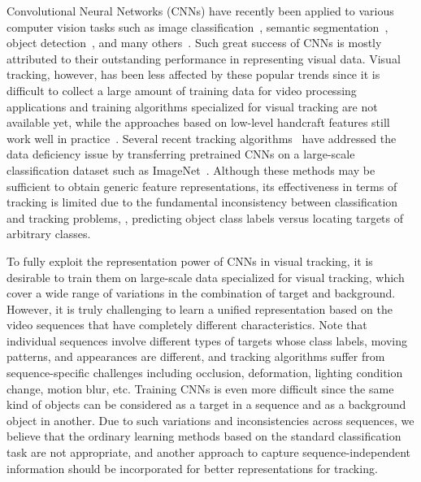 \documentclass[10pt,twocolumn,letterpaper]{article}
\begin{document}
Convolutional Neural Networks (CNNs) have recently been applied to various computer vision tasks such as image classification~\cite{krizhevsky2012imagenet,chatfield2014return,SimonyanICLR15}, semantic segmentation~\cite{long2014fully}, object detection~\cite{girshick2014rich}, and many others~\cite{toshev2014deeppose,taigman2014deepface}.
Such great success of CNNs is mostly attributed to their outstanding performance in representing visual data.
Visual tracking, however, has been less affected by these popular trends since it is difficult to collect a large amount of training data for video processing applications and training algorithms specialized for visual tracking are not available yet, while the approaches based on low-level handcraft features still work well in practice~\cite{henriques2015high,danelljan2014accurate,hong2015multi,zhang2014meem}. 
Several recent tracking algorithms~\cite{hong2015online,wang2015transferring} have addressed the data deficiency issue by transferring pretrained CNNs on a large-scale classification dataset such as ImageNet~\cite{ILSVRC15}. 
Although these methods may be sufficient to obtain generic feature representations, its effectiveness in terms of tracking is limited due to the fundamental inconsistency between classification and tracking problems, \ie, predicting object class labels versus locating targets of arbitrary classes.

To fully exploit the representation power of CNNs in visual tracking, it is desirable to train them on large-scale data specialized for visual tracking, which cover a wide range of variations in the combination of target and background.
However, it is truly challenging to learn a unified representation based on the video sequences that have completely different characteristics.
Note that individual sequences involve different types of targets whose class labels, moving patterns, and appearances are different, and tracking algorithms suffer from sequence-specific challenges including occlusion, deformation, lighting condition change, motion blur, etc.
Training CNNs is even more difficult since the same kind of objects can be considered as a target in a sequence and as a background object in another.
Due to such variations and inconsistencies across sequences, we believe that the ordinary learning methods based on the standard classification task are not appropriate, and another approach to capture sequence-independent information should be incorporated for better representations for tracking.
\end{document}
